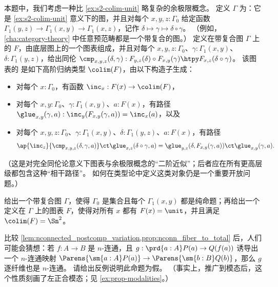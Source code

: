 \begin{ex}\label{ex:s2-colim-unit-2}
  本题中，我们考虑一种比 \cref{ex:s2-colim-unit} 略复杂的余极限概念。
  定义 $\Gamma$ 为：它是 \cref{ex:s2-colim-unit} 意义下的图，并且对每个 $x,y,z:\Gamma_0$ 给定函数 $\Gamma_1(y,z) \to \Gamma_1(x,y) \to \Gamma_1(x,z)$，记作 $\delta\mapsto\gamma \mapsto \delta \circ \gamma$。
  （例如，\cref{cha:category-theory} 中任意预范畴都是一个带复合的图。）
  定义在带复合图 $\Gamma$ 上的 $F$，由底层图上的一个图表组成，并且对每个 $x,y,z:\Gamma_0$、$\gamma:\Gamma_1(x,y)$、$\delta:\Gamma_1(y,z)$，给出同伦 $\cmp_{x,y,z}(\delta,\gamma) : F_{y,z}(\delta) \circ F_{x,y}(\gamma) \htpy F_{x,z}(\delta\circ\gamma)$。
  该图表的 是如下高阶归纳类型 $\colim(F)$，由以下构造子生成：
  \begin{itemize}
  \item 对每个 $x:\Gamma_0$，有函数 $\inc_x:F(x) \to \colim(F)$，
  \item 对每个 $x,y:\Gamma_0$、$\gamma:\Gamma_1(x,y)$、$a:F(x)$，有路径 $\glue_{x,y}(\gamma,a) : \inc_y(F_{x,y}(\gamma,a)) = \inc_x(a)$，以及
  \item 对每个 $x,y,z:\Gamma_0$、$\gamma:\Gamma_1(x,y)$、$\delta:\Gamma_1(y,z)$、$a:F(x)$，有路径
    \[ \ap{\inc_z}{\cmp_{x,y,z}(\delta,\gamma,a)} \ct \glue_{x,z}(\delta\circ \gamma,a) = \glue_{y,z}(\delta,F_{x,y}(\gamma,a)) \ct \glue_{x,y}(\gamma,a). \]
  \end{itemize}
  （这是对完全同伦论意义下图表与余极限概念的“二阶近似”；后者应在所有更高层级都包含这种“相干路径”。
  如何在类型论中定义这类对象仍是一个重要开放问题。）

  给出一个带复合图 $\Gamma$，使得 $\Gamma_0$ 是集合且每个 $\Gamma_1(x,y)$ 都是纯命题；再给出一个定义在 $\Gamma$ 上的图表 $F$，使得对所有 $x$ 都有 $F(x)=\unit$，并且满足 $\colim(F)=\Sn^2$。
\end{ex}

\begin{ex}\label{ex:fiber-map-not-conn}
  比较 \cref{lem:nconnected_postcomp_variation,prop:nconn_fiber_to_total} 后，人们可能会猜想：若 $f:A\to B$ 是 $n$-连通，且 $g:\prd{a:A} P(a) \to Q(f(a))$ 诱导出一个 $n$-连通映射 $\Parens{\sm{a:A} P(a)} \to \Parens{\sm{b:B} Q(b)}$，那么 $g$ 逐纤维也是 $n$-连通。
  请给出反例说明此命题为假。
  （事实上，推广到模态后，这个性质刻画了左正合模态；见 \cref{ex:prop-modalities}。）
\end{ex}

